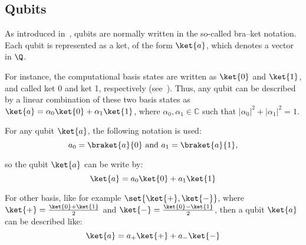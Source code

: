 \subsection{Qubits}
As introduced in~\cite{diracBraket}, qubits are normally written in the so-called bra–ket notation.
Each qubit is represented as a ket, of the form $\ket{a}$, which denotes a vector in $\Q$.

For instance, the computational basis states are written  as $\ket{0}$ and $\ket{1}$, and called ket 0 and ket 1, respectively (see~\cite{NielsenChuang}).
Thus, any qubit can be described by a linear combination of these two basis states as $\ket{a} =\alpha_0\ket{0} +\alpha_1 \ket{1}$, where $\alpha_0,  \alpha_1 \in \mathbb{C}$ such that $ |\alpha_0|^{2}+|\alpha_1|^{2}=1$.

\begin{notation}
	For any qubit $\ket{a}$, the following notation is used:
	\[a_{0}=\braket{a}{0}\text{ and }a_{1}=\braket{a}{1},\]
\end{notation}
so the qubit $\ket{a}$ can be write by:
\begin{equation}
	\label{eq:qubit-coordenadas}
	\ket{a}=a_0\ket{0}+a_1\ket{1}
\end{equation}

For other basis, like for example $\set{\ket{+}, \ket{-}}$, where $\ket{+}=\frac{\ket{0}+\ket{1}}{2}$ and $\ket{-}=\frac{\ket{0}-\ket{1}}{2}$, then a qubit $\ket{a}$ can be described like:
\begin{equation*}
	\ket{a}=a_+\ket{+}+a_-\ket{-}
\end{equation*}